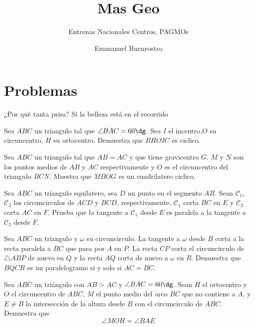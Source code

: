 \documentclass[11pt]{scrartcl}
\title {Mas Geo}
\subtitle{Entrenas Nacionales Centros, PAGMOs}
\author{Emmanuel Buenrostro}
\newcommand{\thmdifficulty}{0}
\newcommand{\problemdiff}[1]{\renewcommand{\thmdifficulty}{#1}}
\begin{document}
\maketitle

\section{Problemas}
\epigraph{¿Por qué tanta prisa? Si la belleza está en el recorrido}{}


\problemdiff{2}
\begin{problem}
    Sea $ABC$ un triangulo tal que $\angle BAC=60\dg$. Sea $I$ el incentro,$O$ su circuncentro, $H$ su ortocentro. Demuestra que  $BHOIC$ es ciclico.
\end{problem}

\problemdiff{2}
\begin{problem}
    Sea $ABC$ un triangulo tal que $AB=AC$ y que tiene gravicentro $G$. $M$ y $N$ son los puntos medios de $AB$ y $AC$ respectivamente y $O$ es el circuncentro del triangulo $BCN$. Muestra que 
    $MBOG$ es un cuadrilatero ciclico.  
\end{problem}

\problemdiff{2}
\begin{problem}
    Sea $ABC$ un triangulo equilatero, sea $D$ un punto en el segmento $AB$. Sean $\mathcal{C}_1$, $\mathcal{C}_2$ los circuncirculos de $ACD$ y $BCD$, respectivamente. $\mathcal{C}_1$ corta $BC$ en $E$ y $\mathcal{C}_2$ corta $AC$ en $F$. Prueba que la tangente a $\mathcal{C}_1$ desde $E$ es paralela a la tangente a $\mathcal{C}_2$ desde $F$.
\end{problem}

\problemdiff{2}
\begin{problem}
   Sea $ABC$ un triangulo y $\omega$ su circuncirculo. La tangente a $\omega$ desde $B$ corta a la recta paralela a $BC$ que pasa por $A$ en $P$. La recta $CP$ corta el circuncirculo 
   de $\triangle ABP$ de nuevo en $Q$ y la recta $AQ$ corta de nuevo a $\omega$ en $R$. Demuestra que $BQCR$ es un paralelogramo si y solo si $AC=BC$.
\end{problem}

\problemdiff{3}
\begin{problem} 
    Sea $ABC$ un triángulo con $AB>AC$ y $\angle BAC=60\dg$. Sean $H$ el ortocentro y $O$ el circuncentro de $ABC$, $M$ el punto medio del arco $BC$ que no contiene a $A$, y $E\neq B$ la intersección de la altura desde $B$ con el circuncirculo de $ABC$. Demuestra que \[\angle MOH=\angle BAE\]
\end{problem}
\end{document}
